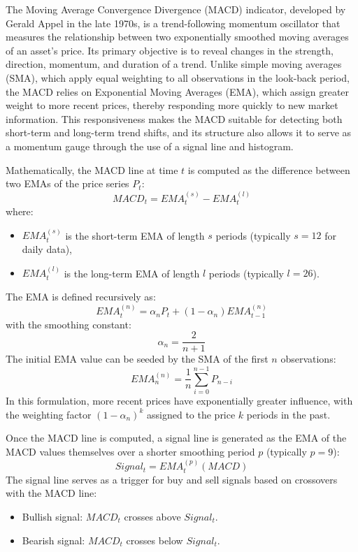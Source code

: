 The Moving Average Convergence Divergence (MACD) indicator, developed by Gerald Appel in the late 1970s, is a trend-following momentum oscillator that measures the relationship between two exponentially smoothed moving averages of an asset’s price. Its primary objective is to reveal changes in the strength, direction, momentum, and duration of a trend. Unlike simple moving averages (SMA), which apply equal weighting to all observations in the look-back period, the MACD relies on Exponential Moving Averages (EMA), which assign greater weight to more recent prices, thereby responding more quickly to new market information. This responsiveness makes the MACD suitable for detecting both short-term and long-term trend shifts, and its structure also allows it to serve as a momentum gauge through the use of a signal line and histogram.

Mathematically, the MACD line at time $t$ is computed as the difference between two EMAs of the price series $P_t$:
\[
MACD_t = EMA_{t}^{(s)} - EMA_{t}^{(l)}
\]
where:
\begin{itemize}
    \item $EMA_{t}^{(s)}$ is the short-term EMA of length $s$ periods (typically $s=12$ for daily data),
    \item $EMA_{t}^{(l)}$ is the long-term EMA of length $l$ periods (typically $l=26$).
\end{itemize}
The EMA is defined recursively as:
\[
EMA_t^{(n)} = \alpha_n P_t + (1 - \alpha_n) EMA_{t-1}^{(n)}
\]
with the smoothing constant:
\[
\alpha_n = \frac{2}{n+1}
\]
The initial EMA value can be seeded by the SMA of the first $n$ observations:
\[
EMA_{n}^{(n)} = \frac{1}{n} \sum_{i=0}^{n-1} P_{n-i}
\]
In this formulation, more recent prices have exponentially greater influence, with the weighting factor $(1-\alpha_n)^k$ assigned to the price $k$ periods in the past.

Once the MACD line is computed, a signal line is generated as the EMA of the MACD values themselves over a shorter smoothing period $p$ (typically $p=9$):
\[
Signal_t = EMA_{t}^{(p)}(MACD)
\]
The signal line serves as a trigger for buy and sell signals based on crossovers with the MACD line:
\begin{itemize}
    \item Bullish signal: $MACD_t$ crosses above $Signal_t$.
    \item Bearish signal: $MACD_t$ crosses below $Signal_t$.
\end{itemize}

